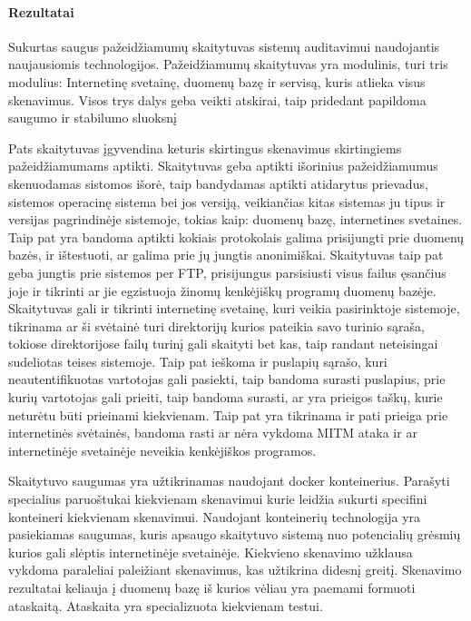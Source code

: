
\paragraph{Rezultatai}

Sukurtas saugus pažeidžiamumų skaitytuvas sistemų auditavimui naudojantis naujausiomis technologijos. Pažeidžiamumų skaitytuvas yra modulinis, turi tris modulius: Internetinę svetainę, duomenų bazę ir servisą, kuris atlieka visus skenavimus. Visos trys dalys geba veikti atskirai, taip pridedant papildoma saugumo ir stabilumo sluoksnį
 
Pats skaitytuvas įgyvendina keturis skirtingus skenavimus skirtingiems pažeidžiamumams aptikti. Skaitytuvas geba aptikti išorinius pažeidžiamumus skenuodamas sistomos išorė, taip bandydamas aptikti atidarytus prievadus, sistemos operacinę sistema bei jos versiją, veikiančias kitas sistemas ju tipus ir versijas pagrindinėje sistemoje, tokias kaip: duomenų bazę, internetines svetaines. Taip pat yra bandoma aptikti kokiais protokolais galima prisijungti prie duomenų bazės, ir ištestuoti, ar galima prie jų jungtis anonimiškai. Skaitytuvas taip pat geba jungtis prie sistemos per FTP, prisijungus parsisiusti visus failus ęsančius joje ir tikrinti ar jie egzistuoja žinomų kenkėjiškų programų duomenų bazėje. Skaitytuvas gali ir tikrinti internetinę svetainę, kuri veikia pasirinktoje sistemoje, tikrinama ar ši svėtainė turi direktorijų kurios pateikia savo turinio sąraša, tokiose direktorijose failų turinį gali skaityti bet kas, taip randant neteisingai sudeliotas teises sistemoje. Taip pat ieškoma ir puslapių sąrašo, kuri neautentifikuotas vartotojas gali pasiekti, taip bandoma surasti puslapius, prie kurių vartotojas gali prieiti, taip bandoma surasti, ar yra prieigos taškų, kurie neturėtu būti prieinami kiekvienam. Taip pat yra tikrinama ir pati prieiga prie internetinės svėtainės, bandoma rasti ar nėra vykdoma MITM ataka ir ar internetinėje svetainėje neveikia kenkėjiškos programos. 

Skaitytuvo saugumas yra užtikrinamas naudojant docker konteinerius. Parašyti specialius paruoštukai kiekvienam skenavimui kurie leidžia sukurti specifini konteineri kiekvienam skenavimui. Naudojant konteinerių technologija yra pasiekiamas saugumas, kuris apsaugo skaitytuvo sistemą nuo potencialių grėsmių kurios gali slėptis internetinėje svetainėje. Kiekvieno skenavimo užklausa vykdoma paraleliai paleižiant skenavimus, kas užtikrina didesnį greitį. Skenavimo rezultatai keliauja į duomenų bazę iš kurios vėliau yra paemami formuoti ataskaitą. Ataskaita yra specializuota kiekvienam testui.

